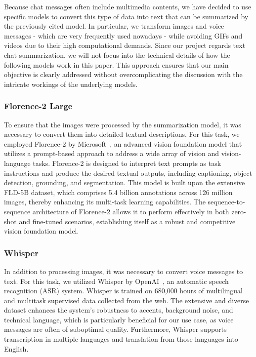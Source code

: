 \documentclass[10pt,twocolumn,letterpaper]{article}
\begin{document}
Because chat messages often include multimedia contents, we have decided to use specific models to convert this type of data into text that can be summarized by the previously cited model. In particular, we transform images and voice messages - which are very frequently used nowadays - while avoiding GIFs and videos due to their high computational demands. 
Since our project regards text chat summarization, we will not focus into the technical details of how the following models work in this paper. This approach ensures that our main objective is clearly addressed without overcomplicating the discussion with the intricate workings of the underlying models.

\subsubsection{Florence-2 Large}

\hspace{1em}To ensure that the images were processed by the summarization model, it was necessary to convert them into detailed textual descriptions. 
For this task, we employed Florence-2 by Microsoft~\cite{xiao2023florence2advancingunifiedrepresentation}, an advanced vision foundation model that utilizes a prompt-based approach to address a wide array of vision and vision-language tasks. 
Florence-2 is designed to interpret text prompts as task instructions and produce the desired textual outputs, including captioning, object detection, grounding, and segmentation. 
This model is built upon the extensive FLD-5B dataset, which comprises 5.4 billion annotations across 126 million images, thereby enhancing its multi-task learning capabilities. 
The sequence-to-sequence architecture of Florence-2 allows it to perform effectively in both zero-shot and fine-tuned scenarios, establishing itself as a robust and competitive vision foundation model.

\subsubsection{Whisper}

\hspace{1em}In addition to processing images, it was necessary to convert voice messages to text. 
For this task, we utilized Whisper by OpenAI~\cite{radford2022robustspeechrecognitionlargescale}, an automatic speech recognition (ASR) system. 
Whisper is trained on 680,000 hours of multilingual and multitask supervised data collected from the web. 
The extensive and diverse dataset enhances the system's robustness to accents, background noise, and technical language, which is particularly beneficial for our use case, as voice messages are often of suboptimal quality. 
Furthermore, Whisper supports transcription in multiple languages and translation from those languages into English.
\end{document}
